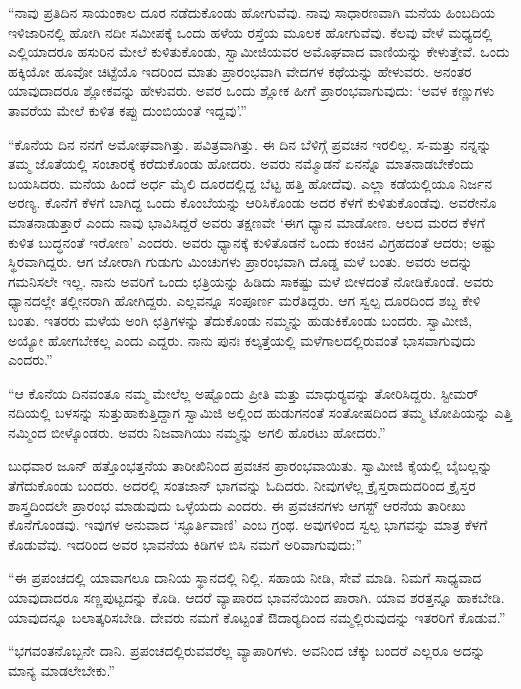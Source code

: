  “ನಾವು ಪ್ರತಿದಿನ ಸಾಯಂಕಾಲ ದೂರ ನಡೆದುಕೊಂಡು ಹೋಗುವೆವು. ನಾವು ಸಾಧಾರಣವಾಗಿ ಮನೆಯ ಹಿಂಬದಿಯ ಇಳಿಜಾರಿನಲ್ಲಿ ಹೋಗಿ ನದೀ ಸಮೀಪಕ್ಕೆ ಒಂದು ಹಳೆಯ ರಸ್ತೆಯ ಮೂಲಕ ಹೋಗುವೆವು. ಕೆಲವು ವೇಳೆ ಮಧ್ಯದಲ್ಲಿ ಎಲ್ಲಿಯಾದರೂ ಹಸುರಿನ ಮೇಲೆ ಕುಳಿತುಕೊಂಡು, ಸ್ವಾಮೀಜಿಯವರ ಅಮೊಘವಾದ ವಾಣಿಯನ್ನು ಕೇಳುತ್ತೇವೆ. ಒಂದು ಹಕ್ಕಿಯೋ ಹೂವೋ ಚಿಟ್ಟೆಯೊ ಇದರಿಂದ ಮಾತು ಪ್ರಾರಂಭವಾಗಿ ವೇದಗಳ ಕಥೆಯನ್ನು ಹೇಳುವರು. ಅನಂತರ ಯಾವುದಾದರೂ ಶ್ಲೋಕವನ್ನು ಹೇಳುವರು. ಅವರ ಒಂದು ಶ್ಲೋಕ ಹೀಗೆ ಪ್ರಾರಂಭವಾಗುವುದು: ‘ಅವಳ ಕಣ್ಣುಗಳು ತಾವರೆಯ ಮೇಲೆ ಕುಳಿತ ಕಪ್ಪು ದುಂಬಿಯಂತೆ ಇದ್ದವು’.” 

 “ಕೊನೆಯ ದಿನ ನನಗೆ ಅಮೋಘವಾಗಿತ್ತು. ಪವಿತ್ರವಾಗಿತ್ತು. ಈ ದಿನ ಬೆಳಿಗ್ಗೆ ಪ್ರವಚನ ಇರಲಿಲ್ಲ. ಸ-ಮತ್ತು ನನ್ನನ್ನು ತಮ್ಮ ಜೊತೆಯಲ್ಲಿ ಸಂಚಾರಕ್ಕೆ ಕರೆದುಕೊಂಡು ಹೋದರು. ಅವರು ನಮ್ಮೊಡನೆ ಏನನ್ನೊ ಮಾತನಾಡಬೇಕೆಂದು ಬಯಸಿದರು. ಮನೆಯ ಹಿಂದೆ ಅರ್ಧ ಮೈಲಿ ದೂರದಲ್ಲಿದ್ದ ಬೆಟ್ಟ ಹತ್ತಿ ಹೋದೆವು. ಎಲ್ಲಾ ಕಡೆಯಲ್ಲಿಯೂ ನಿರ್ಜನ ಅರಣ್ಯ. ಕೊನೆಗೆ ಕೆಳಗೆ ಬಾಗಿದ್ದ ಒಂದು ಕೊಂಬೆಯನ್ನು ಆರಿಸಿಕೊಂಡು ಅದರ ಕೆಳಗೆ ಕುಳಿತುಕೊಂಡೆವು. ಅವರೇನೊ ಮಾತನಾಡುತ್ತಾರೆ ಎಂದು ನಾವು ಭಾವಿಸಿದ್ದರೆ ಅವರು ತಕ್ಷಣವೇ ‘ಈಗ ಧ್ಯಾನ ಮಾಡೋಣ. ಆಲದ ಮರದ ಕೆಳಗೆ ಕುಳಿತ ಬುದ್ಧನಂತೆ ಇರೋಣ’ ಎಂದರು. ಅವರು ಧ್ಯಾನಕ್ಕೆ ಕುಳಿತೊಡನೆ ಒಂದು ಕಂಚಿನ ವಿಗ್ರಹದಂತೆ ಆದರು; ಅಷ್ಟು ಸ್ಥಿರವಾಗಿದ್ದರು. ಆಗ ಜೋರಾಗಿ ಗುಡುಗು ಮಿಂಚುಗಳು ಪ್ರಾರಂಭವಾಗಿ ದೊಡ್ಡ ಮಳೆ ಬಂತು. ಅವರು ಅದನ್ನು ಗಮನಿಸಲೇ ಇಲ್ಲ. ನಾನು ಅವರಿಗೆ ಒಂದು ಛತ್ರಿಯನ್ನು ಹಿಡಿದು ಸಾಕಷ್ಟು ಮಳೆ ಬೀಳದಂತೆ ನೋಡಿಕೊಂಡೆ. ಅವರು ಧ್ಯಾನದಲ್ಲೇ ತಲ್ಲೀನರಾಗಿ ಹೋಗಿದ್ದರು. ಎಲ್ಲವನ್ನೂ ಸಂಪೂರ್ಣ ಮರೆತಿದ್ದರು. ಆಗ ಸ್ವಲ್ಪ ದೂರದಿಂದ ಶಬ್ದ ಕೇಳಿ ಬಂತು. ಇತರರು ಮಳೆಯ ಅಂಗಿ ಛತ್ರಿಗಳನ್ನು ತೆದುಕೊಂಡು ನಮ್ಮನ್ನು ಹುಡುಕಿಕೊಂಡು ಬಂದರು. ಸ್ವಾಮೀಜಿ, ಅಯ್ಯೋ ಹೋಗಬೇಕಲ್ಲ ಎಂದು ಎದ್ದರು. ನಾನು ಪುನಃ ಕಲ್ಕತ್ತೆಯಲ್ಲಿ ಮಳೆಗಾಲದಲ್ಲಿರುವಂತೆ ಭಾಸವಾಗುವುದು ಎಂದರು.” 

 “ಆ ಕೊನೆಯ ದಿನವಂತೂ ನಮ್ಮ ಮೇಲೆಲ್ಲ ಅಷ್ಟೊಂದು ಪ್ರೀತಿ ಮತ್ತು ಮಾಧುರ‍್ಯವನ್ನು ತೋರಿಸಿದ್ದರು. ಸ್ಟೀಮರ್ ನದಿಯಲ್ಲಿ ಬಳಸನ್ನು ಸುತ್ತುಹಾಕುತ್ತಿದ್ದಾಗ ಸ್ವಾಮಿಜಿ ಅಲ್ಲಿಂದ ಹುಡುಗನಂತೆ ಸಂತೋಷದಿಂದ ತಮ್ಮ ಟೋಪಿಯನ್ನು ಎತ್ತಿ ನಮ್ಮಿಂದ ಬೀಳ್ಕೊಂಡರು. ಅವರು ನಿಜವಾಗಿಯು ನಮ್ಮನ್ನು ಅಗಲಿ ಹೊರಟು ಹೋದರು.” 

\delimiter

 ಬುಧವಾರ ಜೂನ್ ಹತ್ತೊಂಭತ್ತನೆಯ ತಾರೀಖಿನಿಂದ ಪ್ರವಚನ ಪ್ರಾರಂಭವಾಯಿತು. ಸ್ವಾಮೀಜಿ ಕೈಯಲ್ಲಿ ಬೈಬಲ್ಲನ್ನು ತೆಗೆದುಕೊಂಡು ಬಂದರು. ಅದರಲ್ಲಿ ಸಂತಜಾನ್ ಭಾಗವನ್ನು ಓದಿದರು. ನೀವುಗಳೆಲ್ಲ ಕ್ರೈಸ್ತರಾದುದರಿಂದ ಕ್ರೈಸ್ತರ ಶಾಸ್ತ್ರದಿಂದಲೇ ಪ್ರಾರಂಭ ಮಾಡುವುದು ಒಳ್ಳೆಯದು ಎಂದರು. ಈ ಪ್ರವಚನಗಳು ಆಗಸ್ಟ್ ಆರನೆಯ ತಾರೀಖು ಕೊನೆಗೊಂಡವು. ಇವುಗಳ ಅನುವಾದ ‘ಸ್ಫೂರ್ತಿವಾಣಿ’ ಎಂಬ ಗ್ರಂಥ. ಅವುಗಳಿಂದ ಸ್ವಲ್ಪ ಭಾಗವನ್ನು ಮಾತ್ರ ಕೆಳಗೆ ಕೊಡುವೆವು. ಇದರಿಂದ ಅವರ ಭಾವನೆಯ ಕಿಡಿಗಳ ಬಿಸಿ ನಮಗೆ ಅರಿವಾಗುವುದು:” 

 “ಈ ಪ್ರಪಂಚದಲ್ಲಿ ಯಾವಾಗಲೂ ದಾನಿಯ ಸ್ಥಾನದಲ್ಲಿ ನಿಲ್ಲಿ. ಸಹಾಯ ನೀಡಿ, ಸೇವೆ ಮಾಡಿ. ನಿಮಗೆ ಸಾಧ್ಯವಾದ ಯಾವುದಾದರೂ ಸಣ್ಣಪುಟ್ಟದನ್ನು ಕೊಡಿ. ಆದರೆ ವ್ಯಾಪಾರದ ಭಾವನೆಯಿಂದ ಪಾರಾಗಿ. ಯಾವ ಶರತ್ತನ್ನೂ ಹಾಕಬೇಡಿ. ಯಾವುದನ್ನೂ ಬಲಾತ್ಕರಿಸಬೇಡಿ. ದೇವರು ನಮಗೆ ಕೊಟ್ಟಂತೆ ಔದಾರ‍್ಯದಿಂದ ನಮ್ಮಲ್ಲಿರುವುದನ್ನು ಇತರರಿಗೆ ಕೊಡುವ.” 

 “ಭಗವಂತನೊಬ್ಬನೇ ದಾನಿ. ಪ್ರಪಂಚದಲ್ಲಿರುವವರೆಲ್ಲ ವ್ಯಾಪಾರಿಗಳು. ಅವನಿಂದ ಚೆಕ್ಕು ಬಂದರೆ ಎಲ್ಲರೂ ಅದನ್ನು ಮಾನ್ಯ ಮಾಡಲೇಬೇಕು.” 

